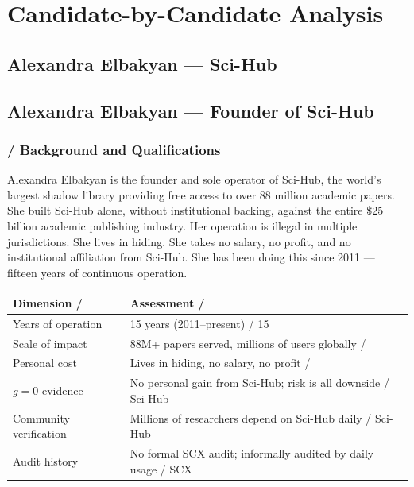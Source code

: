 \documentclass[12pt,a4paper]{article}
\theoremstyle{remark}
\begin{document}
\newpage

\section{}
\section{Candidate-by-Candidate Analysis}

\subsection{Alexandra Elbakyan — Sci-Hub}
\subsection{Alexandra Elbakyan — Founder of Sci-Hub}

\subsubsection{ / Background and Qualifications}

Alexandra Elbakyan is the founder and sole operator of Sci-Hub, the world's
largest shadow library providing free access to over 88 million academic
papers. She built Sci-Hub alone, without institutional backing, against the
entire \$25 billion academic publishing industry. Her operation is illegal in
multiple jurisdictions. She lives in hiding. She takes no salary, no profit,
and no institutional affiliation from Sci-Hub. She has been doing this since
2011 — fifteen years of continuous operation.

\begin{center}
\begin{tabular}{p{} p{}}
\toprule
\textbf{Dimension / } & \textbf{Assessment / } \\
\midrule
Years of operation & 15 years (2011–present) / 15 \\
Scale of impact & 88M+ papers served, millions of users globally /  \\
Personal cost & Lives in hiding, no salary, no profit /  \\
$g=0$ evidence & No personal gain from Sci-Hub; risk is all downside / Sci-Hub \\
Community verification & Millions of researchers depend on Sci-Hub daily / Sci-Hub \\
Audit history & No formal SCX audit; informally audited by daily usage / SCX \\
\bottomrule
\end{tabular}
\end{center}
\end{document}
